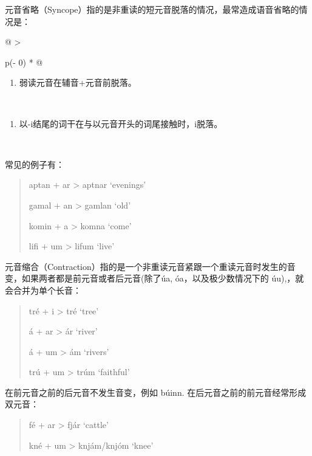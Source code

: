 元音省略（Syncope）指的是非重读的短元音脱落的情况，最常造成语音省略的情况是：

\begin{longtable}[]{@{}
  >{\raggedright\arraybackslash}p{(\columnwidth - 0\tabcolsep) * }@{}}
\toprule\noalign{}
\begin{minipage}[b]{\linewidth}\raggedright
\begin{enumerate}
\def\labelenumi{\arabic{enumi}.}
\item
  \label{_Ref115694569}{}弱读元音在辅音+元音前脱落。
\end{enumerate}
\end{minipage} \\
\midrule\noalign{}
\endhead
\bottomrule\noalign{}
\endlastfoot
\begin{minipage}[t]{\linewidth}\raggedright
\begin{enumerate}
\def\labelenumi{\arabic{enumi}.}
\setcounter{enumi}{1}
\item
  \label{_Ref115709879}{}以-i结尾的词干在与以元音开头的词尾接触时，i脱落。
\end{enumerate}
\end{minipage} \\
\end{longtable}

常见的例子有：

\begin{quote}
aptan + ar \textgreater{} aptnar `evenings'

gamal + an \textgreater{} gamlan `old'

komin + a \textgreater{} komna `come'

lifi + um \textgreater{} lifum `live'
\end{quote}

元音缩合（Contraction）指的是一个非重读元音紧跟一个重读元音时发生的音变，如果两者都是前元音或者后元音(除了úa,
óa，以及极少数情况下的 úu),，就会合并为单个长音：

\begin{quote}
tré + i \textgreater{} tré `tree'

á + ar \textgreater{} ár `river'

á + um \textgreater{} ám `rivers'

trú + um \textgreater{} trúm `faithful'
\end{quote}

在前元音之前的后元音不发生音变，例如 búinn.
在后元音之前的前元音经常形成双元音：

\begin{quote}
fé + ar \textgreater{} fjár `cattle'

kné + um \textgreater{} knjám/knjóm `knee'
\end{quote}

